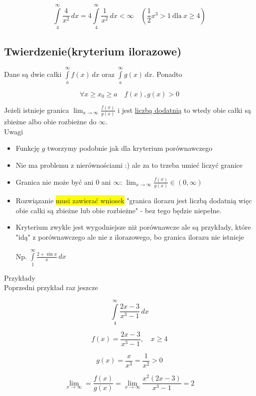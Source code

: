 \documentclass[12pt]{article}
\begin{document}
$$ \int\limits_4^\infty \frac{4}{x^2} \,dx = 4 \int\limits_4^\infty \frac{1}{x^2} \,dx < \infty
\quad \left(\frac{1}{2}x^3 > 1 \ \mathrm{dla} \ x \geq 4 \right) $$

\subsection*{Twierdzenie(kryterium ilorazowe)}

Dane są dwie całki $ \int\limits_a^\infty f(x) \,dx $ oraz $ \int\limits_{a}^{\infty} g(x) \,dx $. Ponadto

$$ \forall x \geq x_0 \geq a \quad f(x), g(x) > 0 $$

Jeżeli istnieje granica $ \lim_{x \to \infty} \frac{f(x)}{g(x)} $ i jest \underline{liczbą dodatnią} to wtedy obie całki
są zbieżne albo obie rozbieżne do $\infty$. \\

Uwagi
\begin{itemize}
    \item Funkcję $g$ tworzymy podobnie jak dla kryterium porównawczego
    \item Nie ma problemu z nierównościami :) ale za to trzeba umieć liczyć granice
    \item Granica nie może być ani 0 ani $\infty$: $ \lim_{x \to \infty} \frac{f(x)}{g(x)} \in (0, \infty) $
    \item Rozwiązanie \colorbox{yellow}{musi zawierać wniosek} "granica ilorazu jest liczbą dodatnią więc obie całki
    są zbieżne lub obie rozbieżne" - bez tego będzie niepełne.
    \item Kryterium zwykle jest wygodniejsze niż porównawcze ale są przykłady, które "idą" z porównawczego ale nie z
    ilorazowego, bo granica ilorazu nie istnieje

    Np. $ \int\limits_{1}^{\infty} \frac{2 + \sin x}{x} \,dx $
\end{itemize}

Przykłady \\

Poprzedni przykład raz jeszcze 

$$ \int\limits_4^\infty \frac{2x - 3}{x^3 - 1} \,dx $$

$$ f(x) = \frac{2x - 3}{x^3 - 1}, \quad x \geq 4 $$

$$ g(x) = \frac{x}{x^3} = \frac{1}{x^2} > 0 $$

$$ \lim_{x \to \infty} = \frac{f(x)}{g(x)} = \lim_{x \to \infty} \frac{x^2(2x - 3)}{x^3 - 1} = 2 $$
\end{document}
